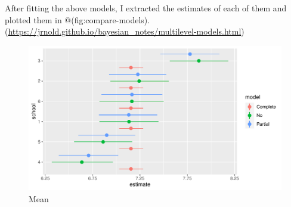 \documentclass[a4, 12pt]{article}
\begin{document}
After fitting the above models, I extracted the estimates of each of them and plotted them in @(fig:compare-models). (\url{https://jrnold.github.io/bayesian_notes/multilevel-models.html})

\begin{figure}[H]

{\centering \includegraphics[width=0.8\linewidth,]{../figures/compare_models} 

}

\caption{Mean}\label{fig:compare-models}
\end{figure}
\end{document}
